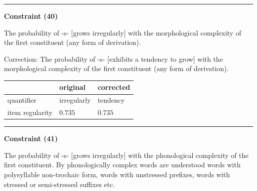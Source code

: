\vspace{-0.75em}
\hrule




\vspace{0.6em}

\begin{center}
\textbf{Constraint (40)}
\end{center}

\noindent
The probability of -s- [grows irregularly] with the morphological complexity of the first constituent (any form of derivation).
\vspace{0.3em}

\noindent
Correction: The probability of -s- [exhibits a tendency to grow] with the morphological complexity of the first constituent (any form of derivation).

\vspace{-0.25em}

\begin{table}[!ht]

\begin{center}
\setlength{\extrarowheight}{1pt}
\begin{tabularx}{\columnwidth}{|X|X|X|}
      \hline
                        & original      & corrected \\
      \hline
      quantifier        & irregularly      & tendency   \\
      \hline
      item regularity   & $0.735$      & $0.735$   \\
      \hline
\end{tabularx}
\end{center}
\end{table}

\vspace{-0.75em}
\hrule




\vspace{0.6em}

\begin{center}
\textbf{Constraint (41)}
\end{center}

\noindent
The probability of -s- [grows irregularly] with the phonological complexity of the first constituent. By phonologically complex words are understood words with polysyllable non-trochaic form, words with unstressed prefixes, words with stressed or semi-stressed suffixes etc.
\vspace{0.3em}

